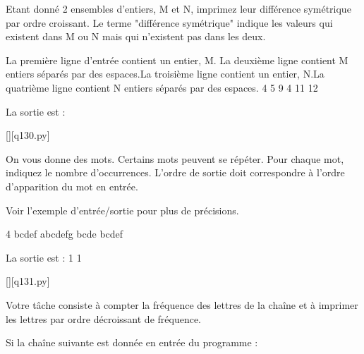 \question
Etant donné 2 ensembles d'entiers, M et N, imprimez leur différence symétrique par ordre croissant. Le terme "différence symétrique" indique les valeurs qui existent dans M ou N mais qui n'existent pas dans les deux.

La première ligne d'entrée contient un entier, M. La deuxième ligne contient M entiers séparés par des espaces.La troisième ligne contient un entier, N.La quatrième ligne contient N entiers séparés par des espaces. 4 5 9 4 11 12\newline

La sortie est :
\renewcommand{\nomfichier}{q130.py}
\begin{solution}
    \pythonfile{\chemincode \nomfichier}[][\nomfichier]
\end{solution}

\question
On vous donne des mots. Certains mots peuvent se répéter. Pour chaque mot, indiquez le nombre d'occurrences. L'ordre de sortie doit correspondre à l'ordre d'apparition du mot en entrée. 

Voir l'exemple d'entrée/sortie pour plus de précisions.\newline

4\newline
bcdef\newline
abcdefg\newline
bcde\newline
bcdef

La sortie est : 1 1
\renewcommand{\nomfichier}{q131.py}
\begin{solution}
    \pythonfile{\chemincode \nomfichier}[][\nomfichier]
\end{solution}


\question
Votre tâche consiste à compter la fréquence des lettres de la chaîne et à imprimer les lettres par ordre décroissant de fréquence.

Si la chaîne suivante est donnée en entrée du programme :\newline

